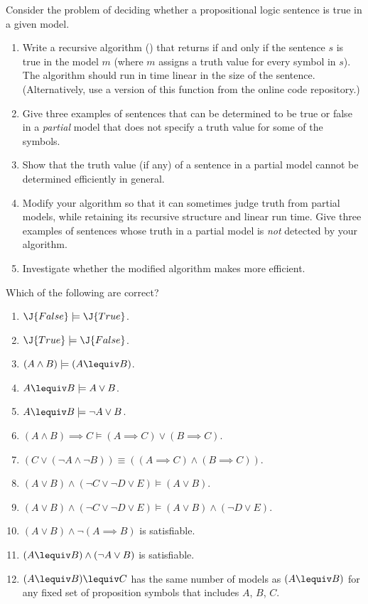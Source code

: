 \begin{exercise}
Consider the problem of deciding whether a propositional logic sentence is 
true in a given model.
\begin{enumerate}
 \item Write a recursive algorithm
 () that returns  if and
 only if the sentence \(s\) is true in the model \(m\) (where \(m\) assigns
 a truth value for every symbol in \(s\)). The algorithm should run in
 time linear in the size of the sentence. (Alternatively, use a version
 of this function from the online code repository.)
\item Give three examples of sentences that can be determined to be true or false in a {\em partial} model
that does not specify a truth value for some of the symbols.
\item Show that the truth value (if any) of a sentence in a partial model
cannot be determined efficiently in general.
\item Modify your  algorithm so that it can sometimes judge truth
from partial models, while retaining its recursive structure and linear run time.
Give three examples of sentences whose truth in a partial model is {\em not} detected by your algorithm.
\item Investigate whether the modified algorithm makes  more efficient.
\end{enumerate}
\end{exercise} 

\begin{uexercise}%
Which of the following are correct?
\begin{enumerate}
\item \(\J{False} \models \J{True}\). 
\item \(\J{True} \models \J{False}\). 
\item \((A\land B)  \models (A\lequiv B)\). 
\item \(A\lequiv B \models A \lor B\).
\item \(A\lequiv B \models \lnot A \lor B\).
\item \((A\land B)\implies C \models (A\implies C)\lor(B\implies C)\).
\item \((C\lor (\lnot A \land \lnot B)) \equiv ((A\implies C) \land (B \implies C))\).
\item \((A\lor B) \land (\lnot C\lor\lnot D\lor E) \models (A\lor B)\).
\item \((A\lor B) \land (\lnot C\lor\lnot D\lor E) \models (A\lor B) \land (\lnot D\lor E)\).
\item \((A\lor B) \land \lnot(A \implies B)\) is satisfiable.
\item \((A\lequiv B) \land (\lnot A \lor B)\) is satisfiable.
\item \((A\lequiv B) \lequiv C\) has the same number of models as \((A\lequiv B)\) for any fixed
set of proposition symbols that includes \(A\), \(B\), \(C\).
\end{enumerate}
\end{uexercise} 

